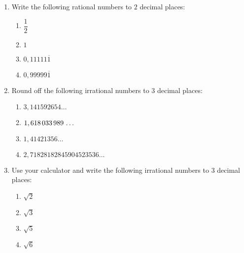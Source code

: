 \begin{eocexercises}{}
\begin{enumerate}[itemsep=5pt, label=\textbf{\arabic*}. ]

\item Write the following rational numbers to $2$ decimal places:
    \begin{enumerate}[itemsep=5pt, label=\textbf{(\alph*)} ]  
    \item $\dfrac{1}{2}$
    \item $1$
    \item $0,11111\overline{1}$
    \item $0,99999\overline{1}$
    \end{enumerate}

\item Round off the following irrational numbers to $3$ decimal places:
\begin{multicols}{2}
    \begin{enumerate}[itemsep=5pt, label=\textbf{(\alph*)} ] 
    \item $3,141592654\ldots$
    \item $1,618\phantom{\rule{0.166667em}{0ex}}033\phantom{\rule{0.166667em}{0ex}}989\phantom{\rule{0.166667em}{0ex}}\ldots$
    \item $1,41421356\ldots$
    \item $2,71828182845904523536\ldots$
    \end{enumerate}
\end{multicols}
\item Use your calculator and write the following irrational numbers to $3$ decimal places:
\begin{multicols}{2}
    \begin{enumerate}[itemsep=5pt, label=\textbf{(\alph*)} ] 
    \item $\sqrt{2}$
    \item $\sqrt{3}$
    \item $\sqrt{5}$
    \item $\sqrt{6}$
    \end{enumerate}
\end{multicols}


\end{enumerate}
\end{eocexercises}
